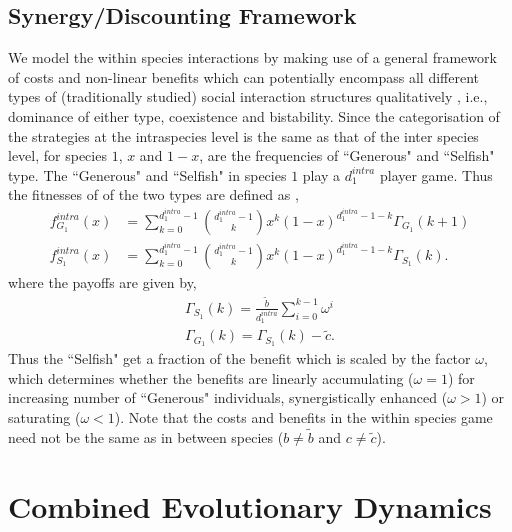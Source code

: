 \documentclass[12pt]{article}
\begin{document}
\begin{appendices}
\subsection*{Synergy/Discounting Framework}
We model the within species interactions by making use of a general framework of costs and non-linear benefits \citep{eshel:AmNat:1988,hauert:JTB:2006a} which can potentially encompass all different types of (traditionally studied) social interaction structures qualitatively \citep{nowak:book:2006}, i.e., dominance of either type, coexistence and bistability.
Since the categorisation of the strategies at the intraspecies level is the same as that of the inter species level, for species $1$, $x$ and $1-x$, are the frequencies of ``Generous" and ``Selfish" type. 
The ``Generous" and ``Selfish" in species $1$ play a $d_1^{intra}$ player game.
Thus the fitnesses of of the two types are defined as \citep{hauert:JTB:2006a},
%
\begin{align}
	f^{intra}_{G_1} (x) &= \sum_{k=0}^{d_1^{intra} -1} \binom{d_1^{intra} -1}{k}x^k (1-x)^{d_1^{intra} -1-k} \Gamma_{G_1}(k+1)  \\
	f^{intra}_{S_1} (x) &= \sum_{k=0}^{d_1^{intra} -1} \binom{d_1^{intra} -1}{k}x^k (1-x)^{d_1^{intra} -1-k} \Gamma_{S_1}(k).
\label{intrafiteqs}
\end{align}
%
where the payoffs are given by,
\begin{align}
	\Gamma_{S_1} (k) = \frac{\tilde{b}}{d_1^{intra}} \sum_{i=0}^{k-1} \omega^i  \\
	\Gamma_{G_1} (k) = \Gamma_{S_1} (k) - \tilde{c}.
\label{eqintragamepayoffs}
\end{align}
%
Thus the ``Selfish" get a fraction of the benefit which is scaled by the factor $\omega$, which determines whether the benefits are linearly accumulating ($\omega=1$) for increasing number of ``Generous" individuals, synergistically enhanced ($\omega>1$) or saturating ($\omega<1$).
Note that the costs and benefits in the within species game need not be the same as in between species ($b\neq \tilde{b}$ and $c \neq \tilde{c}$).


\section{Combined Evolutionary Dynamics}
\label{app:combineddyn}


\end{appendices}
\end{document}

